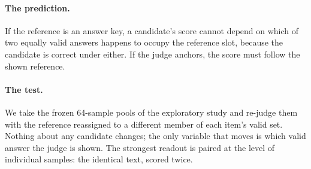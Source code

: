 \documentclass[11pt]{article}
\begin{document}
\paragraph{The prediction.}
If the reference is an answer key, a candidate's score cannot depend on which of two equally valid answers happens to occupy the reference slot, because the candidate is correct under either.
If the judge anchors, the score must follow the shown reference.

\paragraph{The test.}
We take the frozen 64-sample pools of the exploratory study and re-judge them with the reference reassigned to a different member of each item's valid set.
Nothing about any candidate changes; the only variable that moves is which valid answer the judge is shown.
The strongest readout is paired at the level of individual samples: the identical text, scored twice.
\end{document}
